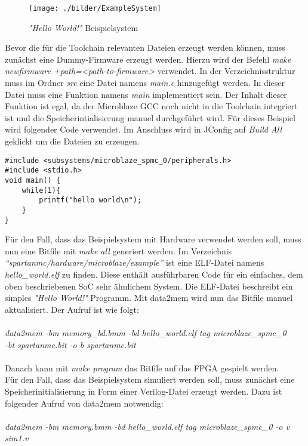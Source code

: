 \begin{figure}[th!]
\centering
\texttt{[image: ./bilder/ExampleSystem]}
\caption{\textit{"Hello World!"} Beispielsystem}
\label{fig:ExampleSystem}
\end{figure}
\noindent
Bevor die für die Toolchain relevanten Dateien erzeugt werden können, muss zunächst eine Dummy-Firmware erzeugt werden. Hierzu wird der Befehl \textit{make newfirmware +path=<path-to-firmware>} verwendet. In der Verzeichnisstruktur muss im Ordner \textit{src} eine Datei namens \textit{main.c} hinzugefügt werden. In dieser Datei muss eine Funktion namens \textit{main} implementiert sein. Der Inhalt dieser Funktion ist egal, da der Microblaze GCC noch nicht in die Toolchain integriert ist und die Speicherintialisierung manuel durchgeführt wird. Für dieses Beispiel wird folgender Code verwendet. Im Anschluss wird in JConfig auf \textit{Build All} geklickt um die Dateien zu erzeugen.
\begin{lstlisting}
#include <subsystems/microblaze_spmc_0/peripherals.h>
#include <stdio.h>
void main() {
	while(1){
		printf("hello world\n");
	}
}
\end{lstlisting}
Für den Fall, dass das Beispielsystem mit Hardware verwendet werden soll, muss nun eine Bitfile mit \textit{make all} generiert werden. Im Verzeichnis \textit{``spartanmc/hardware/microblaze/example''} ist eine ELF-Datei namens \textit{hello\_world.elf} zu finden. Diese enthält ausführbaren Code für ein einfaches, dem oben beschriebenen SoC sehr ähnlichem System. Die ELF-Datei beschreibt ein simples \textit{"Hello World!"} Programm. Mit data2mem wird nun das Bitfile manuel aktualisiert. Der Aufruf ist wie folgt:\\\\
\indent
\textit{data2mem -bm memory\_bd.bmm -bd hello\_world.elf tag microblaze\_spmc\_0\\
\indent \indent \indent -bt spartanmc.bit -o b spartanmc.bit}\\\\
Danach kann mit \textit{make program} das Bitfile auf das FPGA gespielt werden.\\
Für den Fall, dass das Beispielsystem simuliert werden soll, muss zunächst eine Speicherinitialisierung in Form einer Verilog-Datei erzeugt werden. Dazu ist folgender Aufruf von data2mem notwendig:\\\\
\indent
\textit{data2mem -bm memory.bmm -bd hello\_world.elf tag microblaze\_spmc\_0 -o v sim1.v}\\\\
